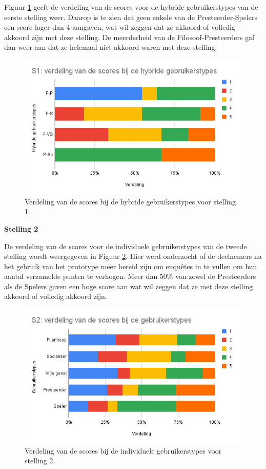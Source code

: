 Figuur \ref{fig:s1_hybride} geeft de verdeling van de scores voor de hybride gebruikerstypes van de eerste stelling weer. Daarop is te zien dat geen enkele van de Presteerder-Spelers een score lager dan 4 aangaven, wat wil zeggen dat ze akkoord of volledig akkoord zijn met deze stelling. De meerderheid van de Filosoof-Presteerders gaf dan weer aan dat ze helemaal niet akkoord waren met deze stelling.

\begin{figure}
    \includegraphics[width=\linewidth]{S1_Hybride.png}
    \caption{Verdeling van de scores bij de hybride gebruikerstypes voor stelling 1.}
    \label{fig:s1_hybride}
\end{figure}


\textbf{Stelling 2}

De verdeling van de scores voor de individuele gebruikerstypes van de tweede stelling wordt weergegeven in Figuur \ref{fig:s2}. Hier werd onderzocht of de deelnemers na het gebruik van het prototype meer bereid zijn om enquêtes in te vullen om hun aantal verzamelde punten te verhogen. Meer dan 50\% van zowel de Presteerders als de Spelers gaven een hoge score aan wat wil zeggen dat ze met deze stelling akkoord of volledig akkoord zijn.

\begin{figure}
    \includegraphics[width=\linewidth]{S2.png}
    \caption{Verdeling van de scores bij de individuele gebruikerstypes voor stelling 2.}
    \label{fig:s2}
\end{figure}

